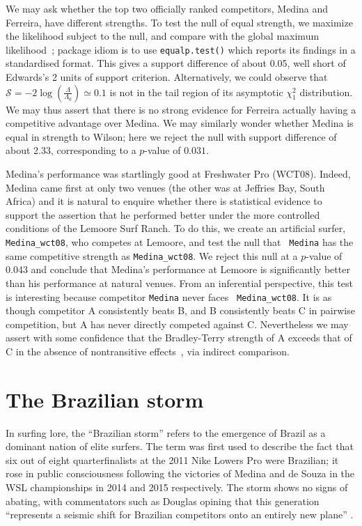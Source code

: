 \documentclass{article}
\begin{document}
We may ask whether the top two officially ranked competitors, Medina
and Ferreira, have different strengths.  To test the null of equal
strength, we maximize the likelihood subject to the null, and compare
with the global maximum likelihood~\citep{hankin2010}; package idiom
is to use {\tt equalp.test()} which reports its findings in a
standardised format.  This gives a support difference of about
0.05, well short of Edwards's 2 units of support criterion.
Alternatively, we could observe that~$\mathcal{S}=
-2\log\left(\frac{\Lambda}{\Lambda_0}\right)\simeq 0.1$ is not in the
tail region of its asymptotic $\chi^2_1$ distribution.  We may thus
assert that there is no strong evidence for Ferreira actually having
a competitive advantage over Medina.  We may similarly wonder whether
Medina is equal in strength to Wilson; here we reject the null with
support difference of about 2.33, corresponding to a $p$-value of
$0.031$.

Medina's performance was startlingly good at Freshwater Pro (WCT08).
Indeed, Medina came first at only two venues (the other
was at Jeffries Bay, South Africa) and it is natural to enquire
whether there is statistical evidence to support the assertion that he
performed better under the more controlled conditions of the Lemoore
Surf Ranch.  To do this, we create an artificial surfer, {\tt
  Medina\_wct08}, who competes at Lemoore, and test the null that {\tt
  Medina} has the same competitive strength as {\tt Medina\_wct08}.
We reject this null at a $p$-value of 0.043 and conclude that Medina's
performance at Lemoore is significantly better than his performance at
natural venues.  From an inferential perspective, this test is
interesting because competitor {\tt Medina} never faces {\tt
  Medina\_wct08}.  It is as though competitor A consistently beats B,
and B consistently beats C in pairwise competition, but A has never
directly competed against C.  Nevertheless we may assert with some
confidence that the Bradley-Terry strength of A exceeds that of C in
the absence of nontransitive effects~\citep{west2008}, via indirect
comparison.

\section{The Brazilian storm}

In surfing lore, the ``Brazilian storm'' refers to the emergence of
Brazil as a dominant nation of elite surfers.  The term was first used
to describe the fact that six out of eight quarterfinalists at the 2011 Nike
Lowers Pro were Brazilian; it rose in public consciousness following
the victories of Medina and de Souza in the WSL
championships in 2014 and 2015 respectively.  The storm shows no signs
of abating, with commentators such as Douglas opining that this
generation ``represents a seismic shift for Brazilian competitors onto
an entirely new plane'' \citep{douglas2020}.
\end{document}
